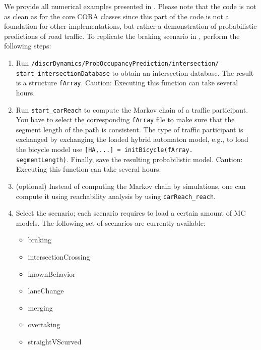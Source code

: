 We provide all numerical examples presented in \cite[Sec.~5]{Althoff2010a}. Please note that the code is not as clean as for the core CORA classes since this part of the code is not a foundation for other implementations, but rather a demonstration of probabilistic predictions of road traffic. To replicate the braking scenario in \cite[Sec.~5]{Althoff2010a}, perform the following steps:
\begin{enumerate}
 \item Run \texttt{/discrDynamics/}\allowbreak\texttt{ProbOccupancyPrediction/}\allowbreak\texttt{intersection/}\allowbreak \\ \texttt{start\_intersectionDatabase} to obtain an intersection database. The result is a structure \texttt{fArray}. Caution: Executing this function can take several hours.
 \item Run \texttt{start\_carReach} to compute the Markov chain of a traffic participant. You have to select the corresponding \texttt{fArray} file to make sure that the segment length of the path is consistent. The type of traffic participant is exchanged by exchanging the loaded hybrid automaton model, e.g., to load the bicycle model use \texttt{[HA,...]~=~}\texttt{initBicycle(}\texttt{fArray.} \\ \texttt{segmentLength)}. Finally, save the resulting probabilistic model. Caution: Executing this function can take several hours.
 \item (optional) Instead of computing the Markov chain by simulations, one can compute it using reachability analysis by using \texttt{carReach\_reach}.
 \item Select the scenario; each scenario requires to load a certain amount of MC models. The following set of scenarios are currently available:
 \begin{itemize}
  \item braking
  \item intersectionCrossing
  \item knownBehavior
  \item laneChange
  \item merging
  \item overtaking
  \item straightVScurved
 \end{itemize}
\end{enumerate}

